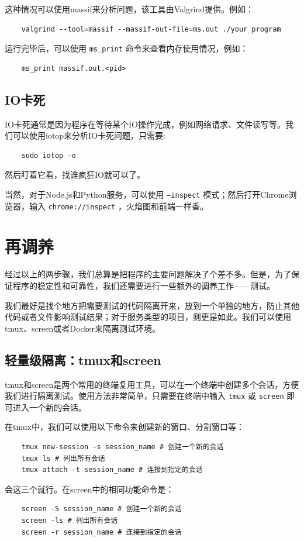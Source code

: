 这种情况可以使用massif来分析问题，该工具由Valgrind提供。例如：
\begin{verbatim}
    valgrind --tool=massif --massif-out-file=ms.out ./your_program
\end{verbatim}

运行完毕后，可以使用 \texttt{ms\_print} 命令来查看内存使用情况，例如：
\begin{verbatim}
    ms_print massif.out.<pid>
\end{verbatim}

\subsection{IO卡死}

IO卡死通常是因为程序在等待某个IO操作完成，例如网络请求、文件读写等。我们可以使用iotop来分析IO卡死问题，只需要:
\begin{verbatim}
    sudo iotop -o
\end{verbatim}
然后盯着它看，找谁疯狂IO就可以了。

当然，对于Node.js和Python服务，可以使用 \texttt{--inspect} 模式；然后打开Chrome浏览器，输入 \texttt{chrome://inspect} ，火焰图和前端一样香。

\section{再调养}

经过以上的两步骤，我们总算是把程序的主要问题解决了个差不多。但是，为了保证程序的稳定性和可靠性，我们还需要进行一些额外的调养工作——测试。

我们最好是找个地方把需要测试的代码隔离开来，放到一个单独的地方，防止其他代码或者文件影响测试结果；对于服务类型的项目，则更是如此。我们可以使用tmux、screen或者Docker来隔离测试环境。

\subsection{轻量级隔离：tmux和screen}\label{sec:tmux}

tmux和screen是两个常用的终端复用工具，可以在一个终端中创建多个会话，方便我们进行隔离测试。使用方法非常简单，只需要在终端中输入 \texttt{tmux} 或 \texttt{screen} 即可进入一个新的会话。

在tmux中，我们可以使用以下命令来创建新的窗口、分割窗口等：
\begin{verbatim}
    tmux new-session -s session_name # 创建一个新的会话
    tmux ls # 列出所有会话
    tmux attach -t session_name # 连接到指定的会话
\end{verbatim}
会这三个就行。在screen中的相同功能命令是：
\begin{verbatim}
    screen -S session_name # 创建一个新的会话
    screen -ls # 列出所有会话
    screen -r session_name # 连接到指定的会话
\end{verbatim}

